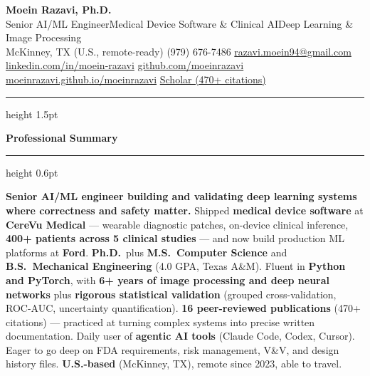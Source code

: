 \documentclass[10.5pt,letterpaper]{article}
\newcommand{\gsep}{\enspace{\color{goldaccent}\bfseries\textperiodcentered}\enspace}
\newcommand{\cvsection}[1]{%
  \vspace{0.45em}%
  {\color{headerblue}\large\bfseries #1}%
  \vspace{0.04em}%
  {\color{goldaccent}\hrule height 0.6pt}%
  \vspace{0.12em}%
}
\begin{document}
\begin{center}
  {\fontsize{20}{24}\selectfont\bfseries\color{headerblue}Moein Razavi, Ph.D.}\\[0.2em]
  {\color{darktext}\large
    Senior AI/ML Engineer\gsep Medical Device Software \& Clinical AI\gsep Deep Learning \& Image Processing
  }\\[0.3em]
  {\color{graytext}
    McKinney, TX (U.S., remote-ready)\gsep
    (979) 676-7486\gsep
    \href{mailto:razavi.moein94@gmail.com}{razavi.moein94@gmail.com}
  }\\[0.15em]
  {\color{graytext}
    \href{https://linkedin.com/in/moein-razavi}{linkedin.com/in/moein-razavi}\gsep
    \href{https://github.com/moeinrazavi}{github.com/moeinrazavi}\gsep
    \href{https://moeinrazavi.github.io/moeinrazavi/}{moeinrazavi.github.io/moeinrazavi}\gsep
    {\color{accentcolor}\href{https://scholar.google.com/citations?user=wj_qWaQAAAAJ}{Scholar (470+ citations)}}
  }
\end{center}

\vspace{0.12em}
{\color{goldaccent}\hrule height 1.5pt}
\vspace{0.22em}

\cvsection{Professional Summary}

{\color{darktext}
\textbf{Senior AI/ML engineer building and validating deep learning systems where correctness and safety matter.} Shipped \textbf{medical device software} at \textbf{CereVu Medical} --- wearable diagnostic patches, on-device clinical inference, \textbf{400+ patients across 5 clinical studies} --- and now build production ML platforms at \textbf{Ford}. \textbf{Ph.D.}\ plus \textbf{M.S.\ Computer Science} and \textbf{B.S.\ Mechanical Engineering} (4.0 GPA, Texas A\&M). Fluent in \textbf{Python and PyTorch}, with \textbf{6+ years of image processing and deep neural networks} plus \textbf{rigorous statistical validation} (grouped cross-validation, ROC-AUC, uncertainty quantification). \textbf{16 peer-reviewed publications} (470+ citations) --- practiced at turning complex systems into precise written documentation. Daily user of \textbf{agentic AI tools} (Claude Code, Codex, Cursor). Eager to go deep on FDA requirements, risk management, V\&V, and design history files. \textbf{U.S.-based} (McKinney, TX), remote since 2023, able to travel.
}
\end{document}
